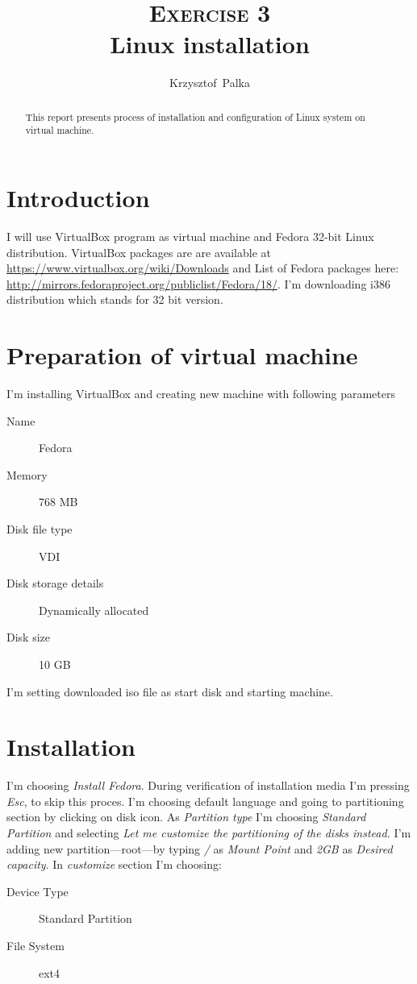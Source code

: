\documentclass[a4paper,12pt]{article}
\author{Krzysztof~Palka}
\title{\textsc{Exercise} 3 \\ Linux installation}
\begin{document}
    \maketitle

    \lstset{showspaces=false,
            showlines=false, 
            language=sh,
            numbers=left,
            firstnumber=last,
            breaklines=true,
            upquote=true}

    \begin{abstract}
        This report presents process of installation and configuration of Linux system on virtual machine. 
    \end{abstract}

	\section{Introduction}
    I will use VirtualBox program as virtual machine and Fedora 32-bit Linux distribution. VirtualBox packages are are available at \url{https://www.virtualbox.org/wiki/Downloads} and List of Fedora packages here: \url{http://mirrors.fedoraproject.org/publiclist/Fedora/18/}. I'm downloading i386 distribution which stands for 32 bit version.  

    \section{Preparation of virtual machine}
    I'm installing VirtualBox and creating new machine with following parameters
    \begin{description}
        \item[Name] Fedora
        \item[Memory] 768 MB
        \item[Disk file type] VDI
        \item[Disk storage details] Dynamically allocated
        \item[Disk size] 10 GB
    \end{description}
    
    I'm setting downloaded iso file as start disk and starting machine.
    \section{Installation}
    I'm choosing \emph{Install Fedora}. During verification of installation media I'm pressing \emph{Esc}, to skip this proces.
    I'm choosing default language and going to partitioning section by clicking on disk icon. As \emph{Partition type} I'm choosing \emph{Standard Partition} and selecting \emph{Let me customize the partitioning of the disks instead.}    
    I'm adding new partition---root---by typing \emph{/} as \emph{Mount Point} and \emph{2GB} as \emph{Desired capacity}. 
    In \emph{customize} section I'm choosing: 
    \begin{description}
        \item[Device Type] Standard Partition
        \item[File System] ext4
    \end{description}
    
\end{document}
